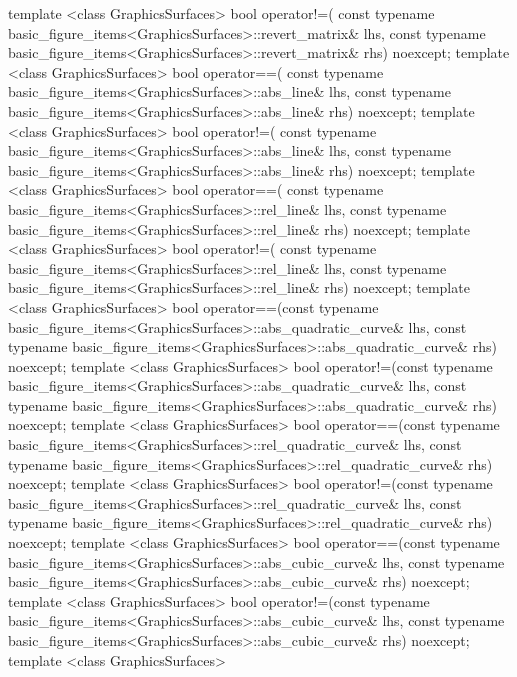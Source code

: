 \begin{codeblock}
{{    template <class GraphicsSurfaces>
    bool operator!=(
      const typename basic_figure_items<GraphicsSurfaces>::revert_matrix& lhs,
      const typename basic_figure_items<GraphicsSurfaces>::revert_matrix& rhs) 
      noexcept;
    template <class GraphicsSurfaces>
    bool operator==(
      const typename basic_figure_items<GraphicsSurfaces>::abs_line& lhs,
      const typename basic_figure_items<GraphicsSurfaces>::abs_line& rhs) 
      noexcept;
    template <class GraphicsSurfaces>
    bool operator!=(
      const typename basic_figure_items<GraphicsSurfaces>::abs_line& lhs,
      const typename basic_figure_items<GraphicsSurfaces>::abs_line& rhs) 
      noexcept;
    template <class GraphicsSurfaces>
    bool operator==(
      const typename basic_figure_items<GraphicsSurfaces>::rel_line& lhs,
      const typename basic_figure_items<GraphicsSurfaces>::rel_line& rhs) 
      noexcept;
    template <class GraphicsSurfaces>
    bool operator!=(
      const typename basic_figure_items<GraphicsSurfaces>::rel_line& lhs,
      const typename basic_figure_items<GraphicsSurfaces>::rel_line& rhs) 
      noexcept;
    template <class GraphicsSurfaces>
    bool operator==(const typename
      basic_figure_items<GraphicsSurfaces>::abs_quadratic_curve& lhs,
      const typename basic_figure_items<GraphicsSurfaces>::abs_quadratic_curve& 
      rhs) noexcept;
    template <class GraphicsSurfaces>
    bool operator!=(const typename 
      basic_figure_items<GraphicsSurfaces>::abs_quadratic_curve& lhs,
      const typename basic_figure_items<GraphicsSurfaces>::abs_quadratic_curve& 
      rhs) noexcept;
    template <class GraphicsSurfaces>
    bool operator==(const typename 
      basic_figure_items<GraphicsSurfaces>::rel_quadratic_curve& lhs,
      const typename basic_figure_items<GraphicsSurfaces>::rel_quadratic_curve& 
      rhs) noexcept;
    template <class GraphicsSurfaces>
    bool operator!=(const typename 
      basic_figure_items<GraphicsSurfaces>::rel_quadratic_curve& lhs,
      const typename basic_figure_items<GraphicsSurfaces>::rel_quadratic_curve& 
      rhs) noexcept;
    template <class GraphicsSurfaces>
    bool operator==(const typename 
      basic_figure_items<GraphicsSurfaces>::abs_cubic_curve& lhs,
      const typename basic_figure_items<GraphicsSurfaces>::abs_cubic_curve& 
      rhs) noexcept;
    template <class GraphicsSurfaces>
    bool operator!=(const typename 
      basic_figure_items<GraphicsSurfaces>::abs_cubic_curve& lhs,
      const typename basic_figure_items<GraphicsSurfaces>::abs_cubic_curve& 
      rhs) noexcept;
    template <class GraphicsSurfaces>
}}
\end{codeblock}
